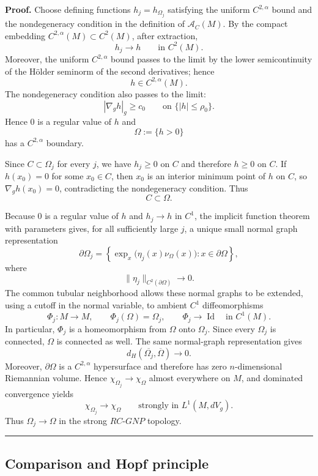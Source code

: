 \documentclass{article}
\newenvironment{proof}[1][Proof]{\textbf{#1.} }{\hfill\rule{0.5em}{0.5em}}
\begin{document}
\begin{proof}
Choose defining functions $h_j=h_{\Omega_j}$ satisfying the uniform
$C^{2,\alpha}$ bound and the nondegeneracy condition in the definition
of $\mathcal A_C(M)$. By the compact embedding
$C^{2,\alpha}(M)\subset C^2(M)$, after extraction,
\[
h_j\longrightarrow h\qquad\text{in }C^2(M).
\]
Moreover, the uniform $C^{2,\alpha}$ bound passes to the limit by the
lower semicontinuity of the Hölder seminorm of the second derivatives;
hence
\[
h\in C^{2,\alpha}(M).
\]
The nondegeneracy condition also passes to the limit:
\[
|\nabla_g h|_g\ge c_0
\qquad\text{on }\{|h|\le\rho_0\}.
\]
Hence $0$ is a regular value of $h$ and
\[
\Omega:=\{h>0\}
\]
has a $C^{2,\alpha}$ boundary.

Since $C\subset\Omega_j$ for every $j$, we have $h_j\ge0$ on $C$ and
therefore $h\ge0$ on $C$. If $h(x_0)=0$ for some $x_0\in C$, then
$x_0$ is an interior minimum point of $h$ on $C$, so
$\nabla_g h(x_0)=0$, contradicting the nondegeneracy condition. Thus
\[
C\subset\Omega.
\]

Because $0$ is a regular value of $h$ and $h_j\to h$ in $C^1$, the
implicit function theorem with parameters gives, for all sufficiently
large $j$, a unique small normal graph representation
\[
\partial\Omega_j
=
\left\{
\exp_x\bigl(\eta_j(x)\nu_\Omega(x)\bigr):
x\in\partial\Omega
\right\},
\]
where
\[
\|\eta_j\|_{C^2(\partial\Omega)}\longrightarrow0.
\]
The common tubular neighborhood allows these normal graphs to be
extended, using a cutoff in the normal variable, to ambient
$C^1$ diffeomorphisms
\[
\Phi_j:M\to M,
\qquad
\Phi_j(\Omega)=\Omega_j,
\qquad
\Phi_j\to\operatorname{Id}\quad\text{in }C^1(M).
\]
In particular, $\Phi_j$ is a homeomorphism from $\Omega$ onto
$\Omega_j$. Since every $\Omega_j$ is connected, $\Omega$ is connected
as well.
The same normal-graph representation gives
\[
d_H(\overline{\Omega_j},\overline{\Omega})\to0.
\]
Moreover, $\partial\Omega$ is a $C^{2,\alpha}$ hypersurface and therefore has
zero $n$-dimensional Riemannian volume. Hence
$\chi_{\Omega_j}\to\chi_\Omega$ almost everywhere on $M$, and dominated
convergence yields
\[
\chi_{\Omega_j}\to\chi_\Omega
\qquad\text{strongly in }L^1(M,dV_g).
\]
Thus $\Omega_j\to\Omega$ in the strong $RC$-$GNP$ topology.
\end{proof}

\subsection{Comparison and Hopf principle}
\end{document}
